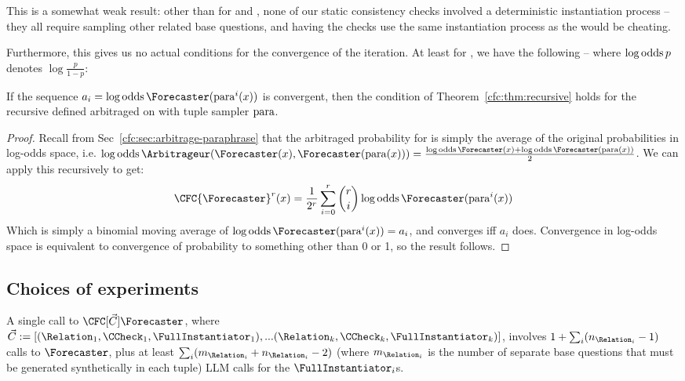 This is a somewhat weak result: other than for \NegChecker{} and \ParaphraseChecker{}, none of our static consistency checks involved a deterministic instantiation process -- they all require sampling other related base questions, and having the checks use the same instantiation process as the \CFCaster{} would be cheating.


Furthermore, this gives us no actual conditions for the convergence of the iteration. At least for \ParaphraseChecker{}, we have the following -- where $\log\operatorname{odds} p$ denotes $\log\frac{p}{1-p}$:

\begin{theorem}
If the sequence $a_i=\logodds\Forecaster(\para^i(x))$ is convergent, then the condition of Theorem~\ref{cfc:thm:recursive} holds for the recursive \CFCaster{} defined arbitraged on \ParaphraseChecker{} with tuple sampler $\operatorname{para}$.
\end{theorem}
\begin{proof}
Recall from Sec~\ref{cfc:sec:arbitrage-paraphrase} that the arbitraged probability for \ParaphraseChecker{} is simply the average of the original probabilities in log-odds space, i.e. $\logodds\Arbitrageur(\Forecaster(x),\Forecaster(\para(x)))=\frac{\logodds\Forecaster(x)+\logodds\Forecaster(\para(x))}{2}$. We can apply this recursively to get:
\begin{equation*}
\CFC{\Forecaster}^r(x)=\frac{1}{2^r}\sum_{i=0}^r{\binom{r}{i}\logodds\Forecaster(\para^i(x))}
\end{equation*}
Which is simply a binomial moving average of $\logodds\Forecaster(\para^i(x))=a_i$, and converges iff $a_i$ does. Convergence in log-odds space is equivalent to convergence of probability to something other than 0 or 1, so the result follows.
\end{proof}

\subsection{Choices of experiments}
\label{cfc:sec:cfcaster-cost}
\label{cfc:app:cfcaster-cost}
A single call to $\CFC[\vec{C}]{\Forecaster}$, where $\vec{C}:=[(\Relation_1,\CCheck_1,\FullInstantiator_1),...(\Relation_k,\CCheck_k,\FullInstantiator_k)]$, involves $1+\sum_i (n_{\Relation_i}-1)$ calls to $\Forecaster$, plus at least $\sum_i(m_{\Relation_i}+n_{\Relation_i}-2)$ (where $m_{\Relation_i}$ is the number of separate base questions that must be generated synthetically in each tuple) LLM calls for the $\FullInstantiator_i$s.

